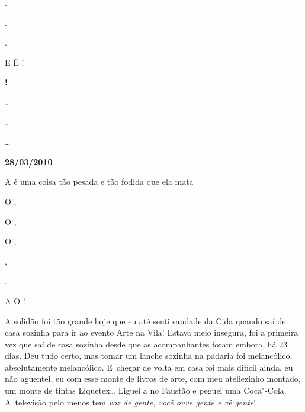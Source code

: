  .

 .

 .

E  É  !

    \textbf{!}

 …

 …

 …

\begin{center}\textbf{\asterisc{}}\end{center}


\begin{flushright}\textbf{}\end{flushright}
 \begin{flushright}\textbf{28/03/2010}\end{flushright}



A  é uma coisa tão pesada e tão fodida que ela mata

O   ,

O   ,

O   ,

     ,

    .

A    O      !

A solidão foi tão grande hoje que eu até senti saudade da Cida quando
saí de casa sozinha para ir ao evento Arte na Vila! Estava meio
insegura, foi a primeira vez que saí de casa sozinha desde que as
acompanhantes foram embora, há 23 dias. Deu tudo certo, mas tomar um
lanche sozinha na padaria foi melancólico, absolutamente melancólico. E~chegar de volta em casa foi mais difícil ainda, eu não aguentei, eu com
esse monte de livros de arte, com meu ateliezinho montado, um monte de
tintas Liquetex… Liguei a  no Faustão e peguei uma Coca"-Cola. A~televisão pelo menos tem \emph{voz de gente, você ouve gente e vê
gente}!

